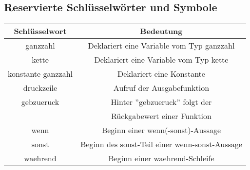 \documentclass[12pt, a4paper, oneside, ngerman]{article}
\begin{document}
\subsection{Reservierte Schlüsselwörter und Symbole}	

\begin{center}
  \begin{tabular}{ | c | c | }
    \hline
    Schlüsselwort       & Bedeutung\\ \hline \hline
    ganzzahl            & Deklariert eine Variable vom Typ ganzzahl\\ \hline
    kette               & Deklariert eine Variable vom Typ kette \\ \hline
    konstante ganzzahl  & Deklariert eine Konstante\\ \hline
    druckzeile          & Aufruf der Ausgabefunktion\\ \hline
    gebzueruck          & Hinter ''gebzueruck'' folgt der \\
                        & Rückgabewert einer Funktion\\ \hline
    wenn                & Beginn einer wenn(-sonst)-Aussage\\ \hline
    sonst               & Beginn des sonst-Teil einer wenn-sonst-Aussage\\ \hline
    waehrend            & Beginn einer waehrend-Schleife\\ \hline
    
  \end{tabular}
\end{center}
\end{document}
